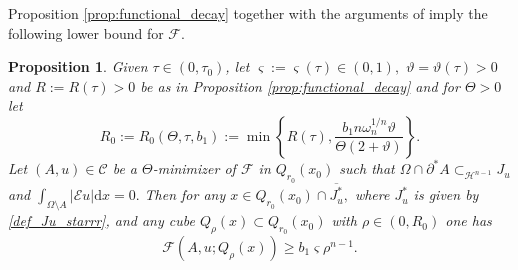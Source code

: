 \documentclass[reqno]{amsart}
\numberwithin{equation}{section}
\theoremstyle{plain}
\newtheorem{proposition}[theorem]{Proposition}
\theoremstyle{definition}
\newcommand{\cH}{\mathcal{H}}
\newcommand{\cF}{\mathcal{F}}
\newcommand{\p}{\partial}
\newcommand{\cl}[1]{\overline{#1}}
\newcommand{\bound}{b}
\renewcommand{\d}{\mathrm{d}}
\newcommand{\str}[1]{\mathcal{E}#1}
\newcommand{\admissible}{\mathcal{C}}
\begin{document}
Proposition \ref{prop:functional_decay} together with the arguments of \cite[Section 4.3]{P:2012} imply the following lower bound for $\cF$.

\begin{proposition} 
\label{prop:lower_density_cG}
Given $\tau\in (0,\tau_0)$, let 
$\varsigma:=\varsigma(\tau)\in(0,1),$ $\vartheta=\vartheta(\tau)>0$ and $R:=R(\tau)>0$ 
be as in Proposition \ref{prop:functional_decay} and for $\Theta>0$ let
$$
R_0:=R_0(\Theta,\tau,\bound_1):= \min\left\{R(\tau),\frac{\bound_1 n \omega_n^{1/n} \vartheta}{\Theta(2+\vartheta)}\right\}.
$$
Let $(A,u)\in\admissible $ be a $\Theta$-minimizer of $\cF$ in $Q_{r_0}(x_0)$ such that 
$\Omega\cap\p^*A\subset_{\cH^{n-1}} J_u$ and $\int_{\Omega\setminus A}|\str{u}|\d x=0.$ Then for any $x\in Q_{r_0}(x_0)\cap \cl{J_u^*},$ where $J_u^*$ is given by \eqref{def_Ju_starrr}, and any cube $Q_\rho(x)\subset Q_{r_0}(x_0)$ with $\rho\in(0,R_0)$ one has 
%
\begin{equation}\label{lower_dens_functiona}
\cF(A,u;Q_\rho(x)) \ge \bound_1\varsigma \rho^{n-1}. 
\end{equation}
%
\end{proposition}
\end{document}
